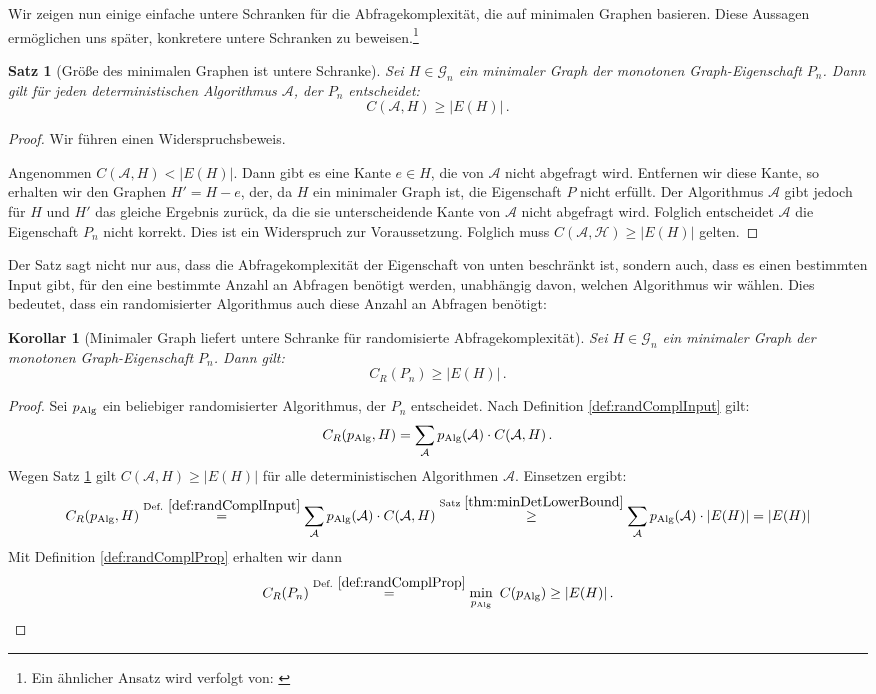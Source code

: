 \documentclass[10pt,a4paper, footheight=1mm]{scrreprt}
\newtheorem{Satz}[definition]{Satz}
\newtheorem{corollary}[definition]{Korollar}
\theoremstyle{definition}
\begin{document}
Wir zeigen nun einige einfache untere Schranken
für die Abfragekomplexität, die auf minimalen
Graphen basieren. Diese Aussagen ermöglichen uns
später, konkretere untere Schranken zu beweisen.\footnote{
Ein ähnlicher Ansatz wird verfolgt von: \cite{Groeger}}
\begin{Satz}[Größe des minimalen Graphen ist untere Schranke]
\label{thm:minDetLowerBound}
Sei $H\in \mathcal{G}_n$ ein minimaler Graph der monotonen
Graph-Eigenschaft $P_n$. Dann gilt für jeden deterministischen
Algorithmus $\mathcal{A}$, der $P_n$ entscheidet:
$$ C(\mathcal{A},H) \geq |E(H)|\,.$$
\end{Satz}
\begin{proof}
Wir führen einen Widerspruchsbeweis.

Angenommen $ C(\mathcal{A},H) < |E(H)| $.
Dann gibt es eine Kante $e\in H$,
die von $\mathcal{A}$ nicht abgefragt wird. Entfernen wir
diese Kante, so erhalten wir den Graphen $H' = H - e$, der,
da $H$ ein minimaler Graph ist, die Eigenschaft $P$ nicht
erfüllt. Der Algorithmus $\mathcal{A}$ gibt jedoch für $H$ und $H'$ das gleiche
Ergebnis zurück, da die sie unterscheidende Kante von $\mathcal{A}$
nicht abgefragt wird. Folglich entscheidet $\mathcal{A}$ die
Eigenschaft $P_n$ nicht korrekt. Dies ist ein Widerspruch zur
Voraussetzung. Folglich muss $ C(\mathcal{A,H}) \geq |E(H)| $ gelten. 
\end{proof}
Der Satz sagt nicht nur aus, dass die Abfragekomplexität
der Eigenschaft von unten beschränkt ist, sondern auch, dass
es einen bestimmten Input gibt, für den eine bestimmte Anzahl
an Abfragen benötigt werden, unabhängig davon, welchen Algorithmus
wir wählen. Dies bedeutet, dass ein randomisierter Algorithmus
auch diese Anzahl an Abfragen benötigt:
\begin{corollary}[Minimaler Graph liefert untere Schranke für 
                  randomisierte Abfragekomplexität]
\label{cor:MinGraphRandCompl}
Sei $H\in \mathcal{G}_n$ ein minimaler Graph der monotonen
Graph-Eigenschaft $P_n$. Dann gilt:
$$C_R(P_n) \geq |E(H)|\,.$$
\end{corollary}
\begin{proof}
Sei $p_\textup{Alg}$ ein beliebiger randomisierter Algorithmus,
der $P_n$ entscheidet.
Nach Definition \ref{def:randComplInput} gilt: 
$$ C_R(p_\textup{Alg}, H) = 
\sum_\mathcal{A} p_\textup{Alg}(\mathcal{A}) \cdot C(\mathcal{A}, H)\,.$$
Wegen Satz \ref{thm:minDetLowerBound} gilt $C(\mathcal{A}, H) \geq |E(H)|$
für alle deterministischen Algorithmen $\mathcal{A}$. Einsetzen ergibt:
$$ C_R(p_\textup{Alg}, H) \overset{\textup{Def. } \ref{def:randComplInput}} {=}
\sum_\mathcal{A} p_\textup{Alg}(\mathcal{A}) \cdot C(\mathcal{A}, H) 
\overset{\textup{Satz } \ref{thm:minDetLowerBound}} {\geq}
\sum_\mathcal{A} p_\textup{Alg}(\mathcal{A}) \cdot |E(H)| =
|E(H)| $$
Mit Definition \ref{def:randComplProp} erhalten wir dann
\begin{equation*}
C_R(P_n) \overset{\textup{Def. } \ref{def:randComplProp}} {=} 
\min_{p_\textup{Alg}}\ C(p_\textup{Alg}) \geq |E(H)|\,. \qedhere
\end{equation*}
\end{proof}
\end{document}
